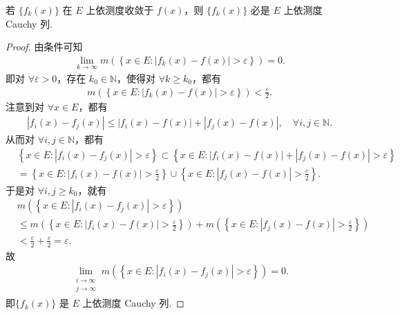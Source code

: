 \documentclass[../../main.tex]{subfiles}
\begin{document}
\begin{theorem}\label{theorem:依测度收敛必是依测度Cauchy列}
若 $\{f_k(x)\}$ 在 $E$ 上依测度收敛于 $f(x)$，则 $\{f_k(x)\}$ 必是 $E$ 上依测度 Cauchy 列.
\end{theorem}
\begin{proof}
由条件可知
\begin{align*}
\lim_{k\rightarrow\infty}m\left(\left\{x\in E:\left|f_k(x)-f(x)\right|>\varepsilon\right\}\right)=0.
\end{align*}
即对 $\forall\varepsilon > 0$，存在 $k_0\in\mathbb{N}$，使得对 $\forall k\geqslant k_0$，都有
\begin{align*}
m\left(\left\{x\in E:\left|f_k(x)-f(x)\right|>\varepsilon\right\}\right)<\frac{\varepsilon}{2}.
\end{align*}
注意到对 $\forall x\in E$，都有
\begin{align*}
\left|f_i(x)-f_j(x)\right|\leqslant\left|f_i(x)-f(x)\right|+\left|f_j(x)-f(x)\right|,\quad\forall i,j\in\mathbb{N}.
\end{align*}
从而对 $\forall i,j\in\mathbb{N}$，都有
\begin{align*}
&\left\{x\in E:\left|f_i(x)-f_j(x)\right|>\varepsilon\right\}\subset\left\{x\in E:\left|f_i(x)-f(x)\right|+\left|f_j(x)-f(x)\right|>\varepsilon\right\}\\
&=\left\{x\in E:\left|f_i(x)-f(x)\right|>\frac{\varepsilon}{2}\right\}\cup\left\{x\in E:\left|f_j(x)-f(x)\right|>\frac{\varepsilon}{2}\right\}.
\end{align*}
于是对 $\forall i,j\geqslant k_0$，就有
\begin{align*}
&m\left(\left\{x\in E:\left|f_i(x)-f_j(x)\right|>\varepsilon\right\}\right)\\
&\leqslant m\left(\left\{x\in E:\left|f_i(x)-f(x)\right|>\frac{\varepsilon}{2}\right\}\right)+m\left(\left\{x\in E:\left|f_j(x)-f(x)\right|>\frac{\varepsilon}{2}\right\}\right)\\
&<\frac{\varepsilon}{2}+\frac{\varepsilon}{2}=\varepsilon.
\end{align*}
故
\begin{align*}
\lim_{\substack{i\rightarrow\infty\\j\rightarrow\infty}}m\left(\left\{x\in E:\left|f_i(x)-f_j(x)\right|>\varepsilon\right\}\right)=0.
\end{align*}
即$\{f_k(x)\}$ 是 $E$ 上依测度 Cauchy 列.

\end{proof}
\end{document}
